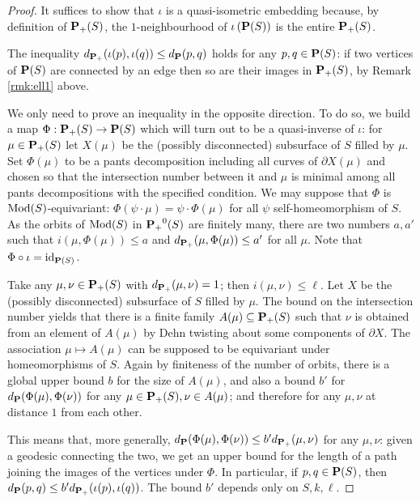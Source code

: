 \begin{proof}
It suffices to show that $\iota$ is a quasi-isometric embedding because, by definition of ${\mathbf{P}_+}(S)$, the $1$-neighbourhood of $\iota\left(\mathbf P(S)\right)$ is the entire ${\mathbf{P}_+}(S)$.

The inequality $d_{\mathbf{P}_+}(\iota(p),\iota(q))\leq d_\mathbf P(p,q)$ holds for any $p,q\in\mathbf P(S)$: if two vertices of $\mathbf P(S)$ are connected by an edge then so are their images in ${\mathbf{P}_+}(S)$, by Remark \ref{rmk:ell1} above.

We only need to prove an inequality in the opposite direction. To do so, we build a map $\Phi:{\mathbf{P}_+}(S)\rightarrow\mathbf P(S)$ which will turn out to be a quasi-inverse of $\iota$: for $\mu\in {\mathbf{P}_+}(S)$ let $X(\mu)$ be the (possibly disconnected) subsurface of $S$ filled by $\mu$. Set $\Phi(\mu)$ to be a pants decomposition including all curves of $\partial X(\mu)$ and chosen so that the intersection number between it and $\mu$ is minimal among all pants decompositions with the specified condition. We may suppose that $\Phi$ is $\mathrm{Mod}(S)$-equivariant: $\Phi(\psi\cdot\mu)=\psi\cdot\Phi(\mu)$ for all $\psi$ self-homeomorphism of $S$. As the orbits of $\mathrm{Mod}(S)$ in ${\mathbf{P}_+}^0(S)$ are finitely many, there are two numbers $a,a'$ such that $i(\mu,\Phi(\mu))\leq a$ and $d_{\mathbf{P}_+}(\mu,\Phi(\mu))\leq a'$ for all $\mu$. Note that $\Phi\circ\iota=\mathrm{id}_{\mathbf P(S)}$.

Take any $\mu,\nu\in{\mathbf{P}_+}(S)$ with $d_{\mathbf{P}_+}(\mu,\nu)=1$; then $i(\mu,\nu)\leq\ell$. Let $X$ be the (possibly disconnected) subsurface of $S$ filled by $\mu$. The bound on the intersection number yields that there is a finite family $A(\mu)\subseteq {\mathbf{P}_+}(S)$ such that $\nu$ is obtained from an element of $A(\mu)$ by Dehn twisting about some components of $\partial X$. The association $\mu\mapsto A(\mu)$ can be supposed to be equivariant under homeomorphisms of $S$. Again by finiteness of the number of orbits, there is a global upper bound $b$ for the size of $A(\mu)$, and also a bound $b'$ for $d_\mathbf P(\Phi(\mu),\Phi(\nu))$ for any $\mu\in{\mathbf{P}_+}(S),\nu\in A(\mu)$; and therefore for any $\mu,\nu$ at distance $1$ from each other.

This means that, more generally, $d_\mathbf P(\Phi(\mu),\Phi(\nu))\leq b' d_{\mathbf{P}_+}(\mu,\nu)$ for any $\mu,\nu$: given a geodesic connecting the two, we get an upper bound for the length of a path joining the images of the vertices under $\Phi$. In particular, if $p,q\in\mathbf P(S)$, then $d_\mathbf P(p,q)\leq b' d_{\mathbf{P}_+}(\iota(p),\iota(q))$. The bound $b'$ depends only on $S,k,\ell$.


\end{proof}
